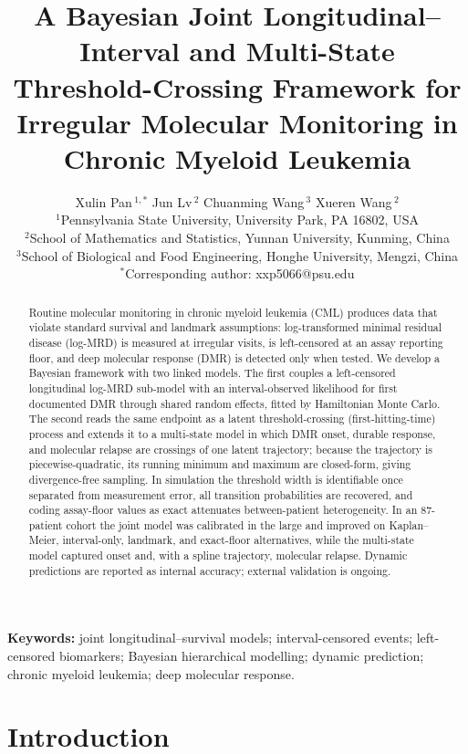 \documentclass[11pt]{article}
\title{A Bayesian Joint Longitudinal--Interval and Multi-State
Threshold-Crossing Framework for Irregular Molecular Monitoring in Chronic
Myeloid Leukemia}
\author{
  Xulin Pan\,$^{1,\ast}$ \quad Jun Lv\,$^{2}$ \quad Chuanming Wang\,$^{3}$ \quad
  Xueren Wang\,$^{2}$ \\[6pt]
  \small $^{1}$Pennsylvania State University, University Park, PA 16802, USA\\
  \small $^{2}$School of Mathematics and Statistics, Yunnan University, Kunming, China\\
  \small $^{3}$School of Biological and Food Engineering, Honghe University, Mengzi, China\\
  \small $^{\ast}$Corresponding author: xxp5066@psu.edu
}
\date{}
\begin{document}
\maketitle

\begin{abstract}
Routine molecular monitoring in chronic myeloid leukemia (CML) produces data
that violate standard survival and landmark assumptions: log-transformed
minimal residual disease (log-MRD) is measured at irregular visits, is
left-censored at an assay reporting floor, and deep molecular response (DMR) is
detected only when tested. We develop a Bayesian framework with
two linked models. The first couples a left-censored longitudinal log-MRD
sub-model with an interval-observed likelihood for first documented DMR through
shared random effects, fitted by Hamiltonian Monte Carlo. The second reads the
same endpoint as a latent threshold-crossing (first-hitting-time) process and
extends it to a multi-state model in which DMR onset, durable response, and
molecular relapse are crossings of one latent trajectory; because
the trajectory is piecewise-quadratic, its running minimum and maximum are
closed-form, giving divergence-free sampling. In simulation the threshold width
is identifiable once separated from measurement error, all transition
probabilities are recovered, and coding assay-floor values as exact attenuates
between-patient heterogeneity. In an 87-patient cohort the joint model was
calibrated in the large and improved on Kaplan--Meier, interval-only, landmark,
and exact-floor alternatives, while the multi-state model captured onset and,
with a spline trajectory, molecular relapse. Dynamic predictions are reported
as internal accuracy; external validation is ongoing.
\end{abstract}

\noindent\textbf{Keywords:} joint longitudinal--survival models;
interval-censored events; left-censored biomarkers; Bayesian hierarchical
modelling; dynamic prediction; chronic myeloid leukemia; deep molecular
response.

\section{Introduction}
\end{document}
